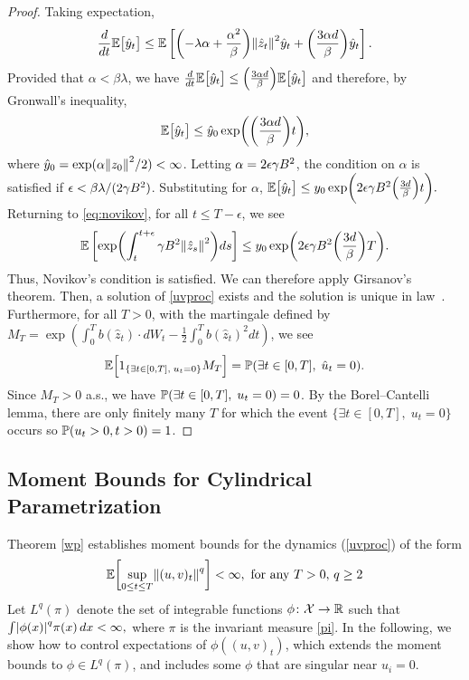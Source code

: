 \documentclass[11pt, twoside]{report}
\begin{document}
\begin{proof}
Taking expectation,
$$
\frac{d}{dt}\EE\bigl[\hat y_t\bigr] \leq \EE\left[\pa{-\lambda \alpha + \frac{\alpha^2}{\beta}}\norm{\hat z_t}^2 \hat y_t + \pa{\frac{3\alpha d}{\beta}} \hat y_t\right].
$$
Provided that $ \alpha<\beta \lambda $, we have $\frac{d}{dt}\EE\bigl[\hat y_t\bigr] \leq  \pa{\frac{3\alpha d}{\beta}} \EE\bigl[\hat y_t\bigr]$ and therefore, by Gronwall's inequality,
$$
\EE\bigl[\hat{y}_t\bigr]  \leq \hat y_0 \exp\biggl(  \pa{\frac{3 \alpha d}{\beta}} t\biggr),
$$
where $\hat{y}_0=\exp(\alpha \norm{z_0}^2/2)<\infty$. 
Letting $\alpha = 2\epsilon \gamma B^2 $, the condition on $\alpha$ is satisfied if $\epsilon  <\beta\lambda/(2\gamma B^2)$. Substituting for $\alpha$,
$
\EE\bigl[\hat{y}_t\bigr]  \leq y_0 \exp\biggl(2\epsilon \gamma \cinfty^2  \pa{\frac{3 d}{\beta}} t\biggr).
$
Returning to \eqref{eq:novikov}, for all $t\leq T-\epsilon$, we see
$$
\EE\left[ \exp\pa{\int_t^{t+\epsilon} \gamma \cinfty^2 \norm{\hat{z}_s}^2} ds \right] \leq y_0\exp\biggl( 2\epsilon \gamma \cinfty^2  \pa{\frac{3 d}{\beta}} T\biggr).
$$
Thus, Novikov's condition is satisfied. We can therefore apply Girsanov's theorem. Then, a solution of \ref{uvproc} exists and the solution is unique in law~\cite{Karatzas1991-xr}.
Furthermore, for all $T>0$, with the martingale defined by $M_T = \exp(\int_0^T b(\hat z_t) \cdot dW_t - \frac12 \int_0^T b(\hat z_t)^2 dt)$, we see
$$
\mathbb{E}\Bigl[1_{\{\exists t\in [0,T], \; u_t=0\}} M_T\Bigr] =\mathbb{P}(\exists t\in [0,T], \;\hat u_t =0).
$$
Since $M_T>0$ a.s., we have $\mathbb{P}(\exists t\in [0,T], \; u_t=0) = 0$.
By the Borel--Cantelli lemma, there are only finitely many $T$ for which the event $\{\exists t\in [0,T],\; u_t=0\}$ occurs so $\mathbb{P}(u_t>0, t>0) = 1$. 
\end{proof}


\subsection{Moment Bounds for Cylindrical Parametrization}
Theorem \ref{wp} establishes moment bounds for the dynamics (\ref{uvproc}) of the form
\begin{equation} \label{uv_moment}
    \mean{\sup_{0\le t\le T} \norm{(u,v)_t}^q}<\infty,\text{ for any }T>0, \, q\ge 2
\end{equation}
Let $L^q(\pi)$ denote the set of integrable functions $\phi\colon\mathcal X\to\mathbb{R}$ such that $\int \abs{\phi(x)}^q \pi(x)\,dx<\infty,$ where $\pi$ is the invariant measure \ref{pi}. In the following,  we show how to control expectations of $\phi((u,v)_t)$, which extends the moment bounds to $\phi\in L^q(\pi)$, and includes some $\phi$ that are singular near $u_i=0$.
\end{document}
